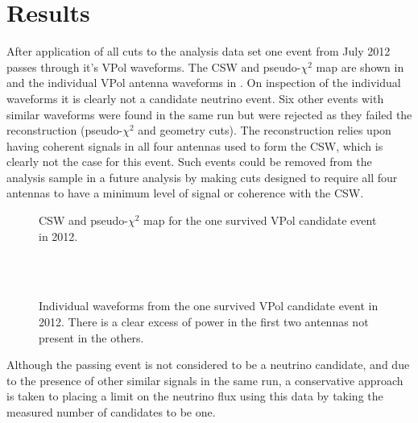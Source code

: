 \chapter{Results}
\label{chap:Results}

After application of all cuts to the analysis data set one event from July 2012 passes through it's VPol waveforms. The CSW and pseudo-$\chi^{2}$ map are shown in  and the individual VPol antenna waveforms in . On inspection of the individual waveforms it is clearly not a candidate neutrino event. Six other events with similar waveforms were found in the same run but were rejected as they failed the reconstruction (pseudo-$\chi^{2}$ and geometry cuts). The reconstruction relies upon having coherent signals in all four antennas used to form the CSW, which is clearly not the case for this event. Such events could be removed from the analysis sample in a future analysis by making cuts designed to require all four antennas to have a minimum level of signal or coherence with the CSW. 

\begin{figure}
  \hfill
  \caption{CSW and pseudo-$\chi^{2}$ map for the one survived VPol candidate event in 2012.}
  \label{fig:Results:CSW-ChiSq}
\end{figure}


\begin{figure}
  \hfill
  \\
  \hfill
  \
  \caption{Individual waveforms from the one survived VPol candidate event in 2012. There is a clear excess of power in the first two antennas not present in the others.}
  \label{fig:Results:Waveforms}
\end{figure}

Although the passing event is not considered to be a neutrino candidate, and due to the presence of other similar signals in the same run, a conservative approach is taken to placing a limit on the neutrino flux using this data by taking the measured number of candidates to be one.

